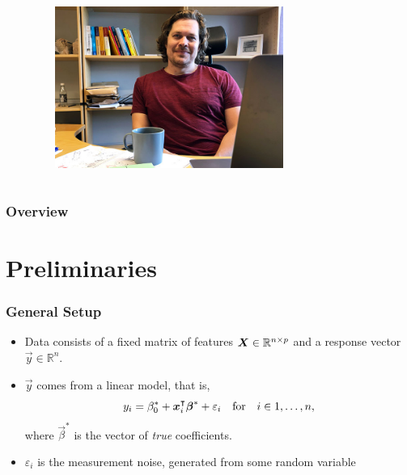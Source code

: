\documentclass[10pt]{beamer}
\begin{document}
\begin{frame}[c]
\begin{columns}[T]
\begin{column}{0.45\textwidth}
    \end{column}
    \begin{column}{0.45\textwidth}
      \begin{figure}
        \hfill%
        \includegraphics[width=0.7\textwidth]{figures/jonas.jpg}
      \end{figure}
    \end{column}
  \end{columns}
\end{frame}

\begin{frame}
  \frametitle{Overview}

  \tableofcontents
\end{frame}

\section{Preliminaries}

\begin{frame}
  \frametitle{General Setup}

  \begin{itemize}
    \item Data consists of a \alert{fixed} matrix of features \(\boldsymbol{X} \in \mathbb{R}^{n \times p}\) and a response vector \(\vec{y} \in \mathbb{R}^n\).
    \item \(\vec{y}\) comes from a linear model, that is,
          \[
            y_i = \beta_0^* + \boldsymbol x_i^\intercal \boldsymbol\beta^* + \varepsilon_i \quad\text{for} \quad i \in 1,\dots,n,
          \]
          where \(\vec{\beta}^*\) is the vector of \emph{true} coefficients.
    \item \(\varepsilon_i\) is the measurement noise, generated from some random variable
  \end{itemize}
\end{frame}
\end{document}
